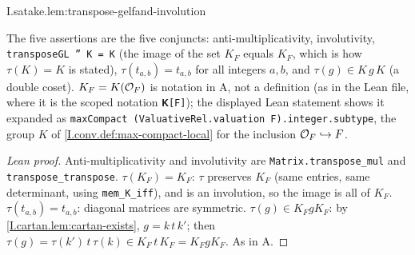 \begin{lemma}
\end{lemma}
\begin{tfformal}{I.satake.lem:transpose-gelfand-involution}
\begin{tffidelity}
The five assertions are the five conjuncts: anti-multiplicativity, involutivity, \texttt{transposeGL '' K = K} (the image of the set $K_F$ equals $K_F$, which is how $\tau(K)=K$ is stated), $\tau(t_{a,b})=t_{a,b}$ for all integers $a,b$, and $\tau(g)\in K\,g\,K$ (a double coset). $K_F=K(\mathcal{O}_F)$ is notation in A, not a definition (as in the Lean file, where it is the scoped notation \texttt{𝐊[F]}); the displayed Lean statement shows it expanded as \texttt{maxCompact (ValuativeRel.valuation F).integer.subtype}, the group $K$ of \cref{I.conv.def:max-compact-local} for the inclusion $\mathcal{O}_F\hookrightarrow F$.
\end{tffidelity}
\end{tfformal}
\begin{proof}[Lean proof]
Anti-multiplicativity and involutivity are \texttt{Matrix.transpose\_mul} and \texttt{transpose\_transpose}. $\tau(K_F)=K_F$: $\tau$ preserves $K_F$ (same entries, same determinant, using \texttt{mem\_K\_iff}), and is an involution, so the image is all of $K_F$. $\tau(t_{a,b})=t_{a,b}$: diagonal matrices are symmetric. $\tau(g)\in K_FgK_F$: by \cref{I.cartan.lem:cartan-exists}, $g=k\,t\,k'$; then $\tau(g)=\tau(k')\,t\,\tau(k)\in K_F\,t\,K_F=K_FgK_F$. As in A.
\end{proof}

